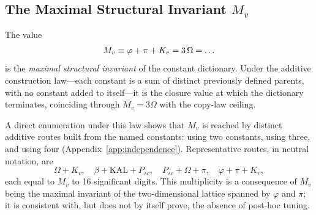 \documentclass[12pt,a4paper]{article}
\begin{document}
\subsection{The Maximal Structural Invariant \texorpdfstring{$M_v$}{M_v}}
\label{sec:sovereigns}

The value
\begin{equation}
M_v \equiv \varphi+\pi+K_v = 3\,\Omega = \val{M_V_d9}\ldots
\label{eq:sigma9}
\end{equation}
is the \emph{maximal structural invariant} of the constant dictionary. Under the
additive construction law---each constant is a sum of distinct previously defined
parents, with no constant added to itself---it is the closure value at which the
dictionary terminates, coinciding through $M_v=3\Omega$ with the copy-law ceiling.

A direct enumeration under this law shows that $M_v$ is reached by
\emph{} distinct additive routes built from the named constants:  using
two constants,  using three, and  using four (Appendix~\ref{app:independence}).
Representative routes, in neutral notation, are
\begin{equation}
\Omega+K_v,\quad \beta+\mathrm{KAL}+P_{sc},\quad P_{sc}+\Omega+\pi,\quad \varphi+\pi+K_v ,
\end{equation}
each equal to $M_v$ to 16 significant digits. This multiplicity is a
consequence of $M_v$ being the maximal invariant of the two-dimensional
lattice spanned by $\varphi$ and $\pi$; it is consistent with, but does not by itself
prove, the absence of post-hoc tuning.
\end{document}
